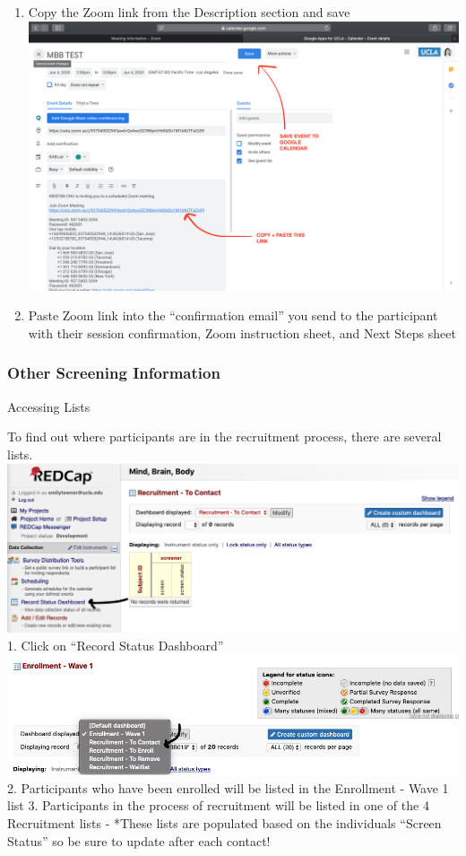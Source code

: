 \documentclass[]{book}
\begin{document}
\begin{enumerate}
\item
  Copy the Zoom link from the Description section and save \includegraphics{images/zoom_link/7.png}
\item
  Paste Zoom link into the ``confirmation email'' you send to the participant with their session confirmation, Zoom instruction sheet, and Next Steps sheet
\end{enumerate}

\hypertarget{other-screening-information-1}{%
\subsubsection{Other Screening Information}\label{other-screening-information-1}}

Accessing Lists

To find out where participants are in the recruitment process, there are several lists.
\includegraphics{images/redcap_screening/7.png}
1. Click on ``Record Status Dashboard''
\includegraphics{images/redcap_screening/8.png}
2. Participants who have been enrolled will be listed in the Enrollment - Wave 1 list
3. Participants in the process of recruitment will be listed in one of the 4 Recruitment lists
- *These lists are populated based on the individuals ``Screen Status'' so be sure to update after each contact!
\end{document}
